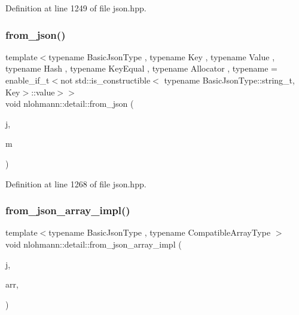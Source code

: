 Definition at line 1249 of file json.\+hpp.

\mbox{\label{namespacenlohmann_1_1detail_aef5c8ea108f4d2b03fb4a635617510de}} 
\subsubsection{\texorpdfstring{from\+\_\+json()}{from\_json()}\hspace{0.1cm}{\footnotesize\ttfamily [18/18]}}
{\footnotesize\ttfamily template$<$typename Basic\+Json\+Type , typename Key , typename Value , typename Hash , typename Key\+Equal , typename Allocator , typename  = enable\+\_\+if\+\_\+t$<$not std\+::is\+\_\+constructible$<$                                     typename Basic\+Json\+Type\+::string\+\_\+t, Key$>$\+::value$>$$>$ \\
void nlohmann\+::detail\+::from\+\_\+json (\begin{DoxyParamCaption}\item[{const Basic\+Json\+Type \&}]{j,  }\item[{std\+::unordered\+\_\+map$<$ Key, Value, Hash, Key\+Equal, Allocator $>$ \&}]{m }\end{DoxyParamCaption})}



Definition at line 1268 of file json.\+hpp.

\mbox{\label{namespacenlohmann_1_1detail_ac53673a5ce29fb69b96d41dad33cb3b0}} 
\subsubsection{\texorpdfstring{from\+\_\+json\+\_\+array\+\_\+impl()}{from\_json\_array\_impl()}\hspace{0.1cm}{\footnotesize\ttfamily [1/3]}}
{\footnotesize\ttfamily template$<$typename Basic\+Json\+Type , typename Compatible\+Array\+Type $>$ \\
void nlohmann\+::detail\+::from\+\_\+json\+\_\+array\+\_\+impl (\begin{DoxyParamCaption}\item[{const Basic\+Json\+Type \&}]{j,  }\item[{Compatible\+Array\+Type \&}]{arr,  }\item[{\hyperlink{structnlohmann_1_1detail_1_1priority__tag}{priority\+\_\+tag}$<$ 0 $>$}]{ }\end{DoxyParamCaption})}



